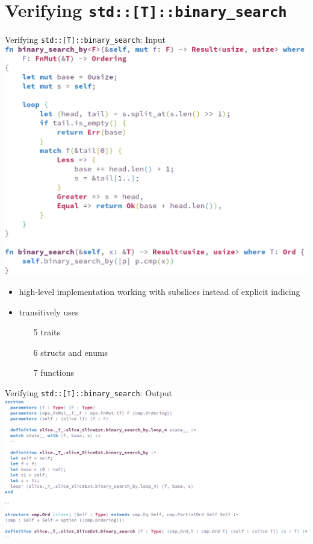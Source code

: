 \documentclass{beamer}
\begin{document}
\section{Verifying \texttt{std::[T]::binary\_search}}

\begin{frame}{Verifying \texttt{std::[T]::binary\_search}: Input}
  \includegraphics[height=0.5\textheight]{binary_search}
  \begin{itemize}
    \item high-level implementation working with subslices instead of explicit indicing
    \item transitively uses
      \begin{itemize}
        \item[5] traits
        \item[6] structs and enums
        \item[7] functions
      \end{itemize}
  \end{itemize}
\end{frame}

\begin{frame}{Verifying \texttt{std::[T]::binary\_search}: Output}
  \includegraphics[width=\textwidth]{generated}
\end{frame}
\end{document}
